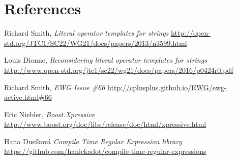 \documentclass{wg21}
\begin{document}
\section{References}
\renewcommand{\section}[2]{}%
\begin{thebibliography}{9}

    Richard Smith,
    \emph{Literal operator templates for strings}\newline
    \url{http://open-std.org/JTC1/SC22/WG21/docs/papers/2013/n3599.html}

    Louis Dionne,
    \emph{Reconsidering literal operator templates for strings}\newline
    \url{http://www.open-std.org/jtc1/sc22/wg21/docs/papers/2016/p0424r0.pdf}

    Richard Smith,
    \emph{EWG Issue \#66}\newline
    \url{http://cplusplus.github.io/EWG/ewg-active.html#66}

    Eric Niebler,
    \emph{Boost.Xpressive}\newline
    \url{http://www.boost.org/doc/libs/release/doc/html/xpressive.html}

    Hana Dus\'{i}kov\'{a}
    \emph{Compile Time Regular Expression library}\newline
    \url{https://github.com/hanickadot/compile-time-regular-expressions}

\end{thebibliography}
\end{document}
